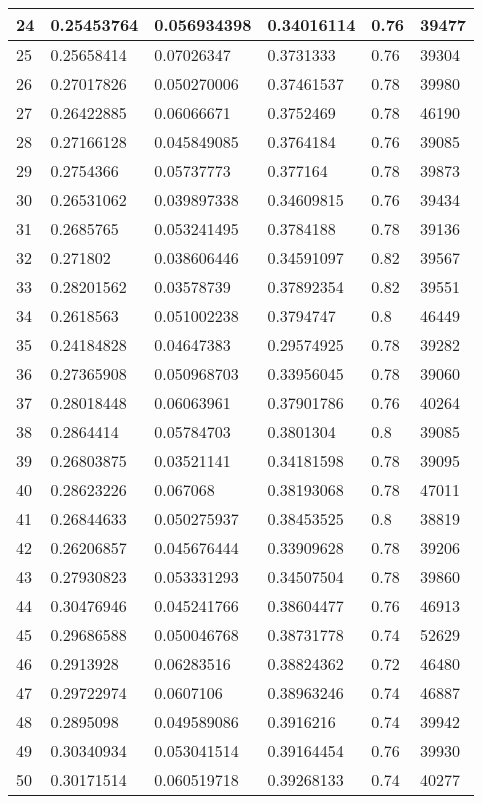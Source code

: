\begin{longtable}{|l|l|l|l|l|l|}
24 & 0.25453764 & 0.056934398 & 0.34016114 & 0.76 & 39477 \\ \hline 
25 & 0.25658414 & 0.07026347 & 0.3731333 & 0.76 & 39304 \\ \hline 
26 & 0.27017826 & 0.050270006 & 0.37461537 & 0.78 & 39980 \\ \hline 
27 & 0.26422885 & 0.06066671 & 0.3752469 & 0.78 & 46190 \\ \hline 
28 & 0.27166128 & 0.045849085 & 0.3764184 & 0.76 & 39085 \\ \hline 
29 & 0.2754366 & 0.05737773 & 0.377164 & 0.78 & 39873 \\ \hline 
30 & 0.26531062 & 0.039897338 & 0.34609815 & 0.76 & 39434 \\ \hline 
31 & 0.2685765 & 0.053241495 & 0.3784188 & 0.78 & 39136 \\ \hline 
32 & 0.271802 & 0.038606446 & 0.34591097 & 0.82 & 39567 \\ \hline 
33 & 0.28201562 & 0.03578739 & 0.37892354 & 0.82 & 39551 \\ \hline 
34 & 0.2618563 & 0.051002238 & 0.3794747 & 0.8 & 46449 \\ \hline 
35 & 0.24184828 & 0.04647383 & 0.29574925 & 0.78 & 39282 \\ \hline 
36 & 0.27365908 & 0.050968703 & 0.33956045 & 0.78 & 39060 \\ \hline 
37 & 0.28018448 & 0.06063961 & 0.37901786 & 0.76 & 40264 \\ \hline 
38 & 0.2864414 & 0.05784703 & 0.3801304 & 0.8 & 39085 \\ \hline 
39 & 0.26803875 & 0.03521141 & 0.34181598 & 0.78 & 39095 \\ \hline 
40 & 0.28623226 & 0.067068 & 0.38193068 & 0.78 & 47011 \\ \hline 
41 & 0.26844633 & 0.050275937 & 0.38453525 & 0.8 & 38819 \\ \hline 
42 & 0.26206857 & 0.045676444 & 0.33909628 & 0.78 & 39206 \\ \hline 
43 & 0.27930823 & 0.053331293 & 0.34507504 & 0.78 & 39860 \\ \hline 
44 & 0.30476946 & 0.045241766 & 0.38604477 & 0.76 & 46913 \\ \hline 
45 & 0.29686588 & 0.050046768 & 0.38731778 & 0.74 & 52629 \\ \hline 
46 & 0.2913928 & 0.06283516 & 0.38824362 & 0.72 & 46480 \\ \hline 
47 & 0.29722974 & 0.0607106 & 0.38963246 & 0.74 & 46887 \\ \hline 
48 & 0.2895098 & 0.049589086 & 0.3916216 & 0.74 & 39942 \\ \hline 
49 & 0.30340934 & 0.053041514 & 0.39164454 & 0.76 & 39930 \\ \hline 
50 & 0.30171514 & 0.060519718 & 0.39268133 & 0.74 & 40277 \\ \hline 
\end{longtable}